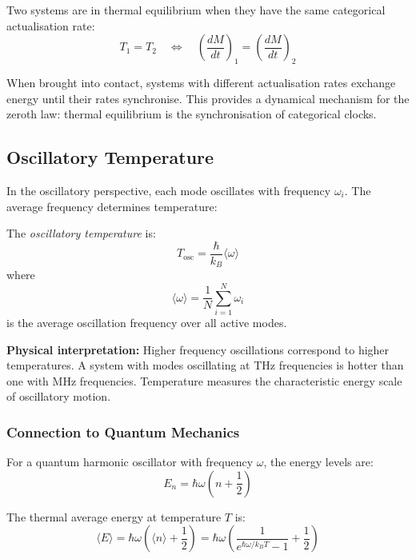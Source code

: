 Two systems are in thermal equilibrium when they have the same categorical actualisation rate:
\begin{equation}
T_1 = T_2 \quad \Leftrightarrow \quad \left(\frac{dM}{dt}\right)_1 = \left(\frac{dM}{dt}\right)_2
\end{equation}

When brought into contact, systems with different actualisation rates exchange energy until their rates synchronise. This provides a dynamical mechanism for the zeroth law: thermal equilibrium is the synchronisation of categorical clocks.

\subsection{Oscillatory Temperature}

In the oscillatory perspective, each mode oscillates with frequency $\omega_i$. The average frequency determines temperature:

\begin{definition}
The \textit{oscillatory temperature} is:
\begin{equation}
\boxed{T_{\text{osc}} = \frac{\hbar}{k_B} \langle\omega\rangle}
\label{eq:oscillatory_temperature}
\end{equation}
where
\begin{equation}
\langle\omega\rangle = \frac{1}{N} \sum_{i=1}^{N} \omega_i
\end{equation}
is the average oscillation frequency over all active modes.
\end{definition}

\textbf{Physical interpretation:} Higher frequency oscillations correspond to higher temperatures. A system with modes oscillating at THz frequencies is hotter than one with MHz frequencies. Temperature measures the characteristic energy scale of oscillatory motion.

\subsubsection{Connection to Quantum Mechanics}

For a quantum harmonic oscillator with frequency $\omega$, the energy levels are:
\begin{equation}
E_n = \hbar\omega\left(n + \frac{1}{2}\right)
\end{equation}

The thermal average energy at temperature $T$ is:
\begin{equation}
\langle E \rangle = \hbar\omega\left(\langle n \rangle + \frac{1}{2}\right) = \hbar\omega\left(\frac{1}{e^{\hbar\omega/k_B T} - 1} + \frac{1}{2}\right)
\end{equation}


